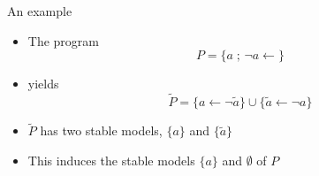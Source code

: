 \begin{frame}{An example}
  \begin{itemize}
    \item<1-> The program
          \[
            P = \{ a\;;\, {\neg a} \leftarrow \}
          \]
    \item<2-> [] yields
          \[
            \widetilde{P}
            =
            \{
            a \leftarrow {\neg \widetilde{a}}
            \}
            \cup
            \{
            \widetilde{a}\leftarrow{\neg a}
            \}
          \]
    \item<3-> $\widetilde{P}$ has two stable models, $\{a\}$ and $\{\widetilde{a}\}$
    \item<4-> This induces the stable models $\{a\}$ and $\emptyset$ of $P$
  \end{itemize}
\end{frame}
%
